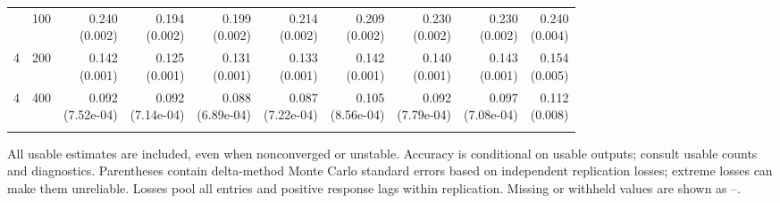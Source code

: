 \begin{table}[p]
{\begin{tabular}{llrrrrrrrr}
\addlinespace
4 & 100 & \shortstack{0.240\\(0.002)} & \shortstack{0.194\\(0.002)} & \shortstack{0.199\\(0.002)} & \shortstack{0.214\\(0.002)} & \shortstack{0.209\\(0.002)} & \shortstack{0.230\\(0.002)} & \shortstack{0.230\\(0.002)} & \shortstack{0.240\\(0.004)} \\
4 & 200 & \shortstack{0.142\\(0.001)} & \shortstack{0.125\\(0.001)} & \shortstack{0.131\\(0.001)} & \shortstack{0.133\\(0.001)} & \shortstack{0.142\\(0.001)} & \shortstack{0.140\\(0.001)} & \shortstack{0.143\\(0.001)} & \shortstack{0.154\\(0.005)} \\
4 & 400 & \shortstack{0.092\\(7.52e-04)} & \shortstack{0.092\\(7.14e-04)} & \shortstack{0.088\\(6.89e-04)} & \shortstack{0.087\\(7.22e-04)} & \shortstack{0.105\\(8.56e-04)} & \shortstack{0.092\\(7.79e-04)} & \shortstack{0.097\\(7.08e-04)} & \shortstack{0.112\\(0.008)} \\
\addlinespace
\bottomrule\end{tabular}}
\par\medskip
\begin{minipage}{\linewidth}\footnotesize All usable estimates are included, even when nonconverged or unstable. Accuracy is conditional on usable outputs; consult usable counts and diagnostics. Parentheses contain delta-method Monte Carlo standard errors based on independent replication losses; extreme losses can make them unreliable. Losses pool all entries and positive response lags within replication. Missing or withheld values are shown as --.\end{minipage}
\end{table}
